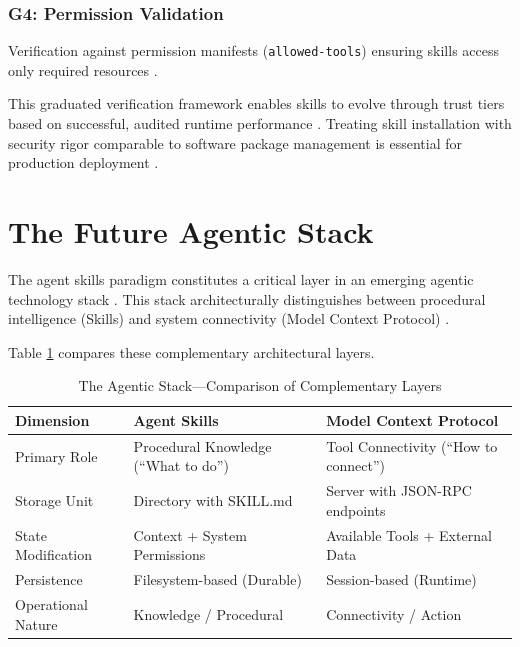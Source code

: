 \documentclass[11pt,a4paper]{article}
\begin{document}
\subsubsection{G4: Permission Validation}

Verification against permission manifests (\texttt{allowed-tools}) ensuring skills access only required resources \cite{alphaxiv2024skills, lmkit2024agentskills}.

This graduated verification framework enables skills to evolve through trust tiers based on successful, audited runtime performance \cite{researchgate2024agentskills}. Treating skill installation with security rigor comparable to software package management is essential for production deployment \cite{researchgate2024agentskills, claude2024agentskills, lobehub2024wereply}.

\section{The Future Agentic Stack}

The agent skills paradigm constitutes a critical layer in an emerging agentic technology stack \cite{alphaxiv2024skills, arxiv2024skillframework}. This stack architecturally distinguishes between procedural intelligence (Skills) and system connectivity (Model Context Protocol) \cite{arxiv2024skillframework}.

Table \ref{tab:stack} compares these complementary architectural layers.

\begin{table}[htp]
\centering
\caption{The Agentic Stack---Comparison of Complementary Layers}
\label{tab:stack}

\begin{tabular}{@{}p{3cm}p{5.5cm}p{5.5cm}@{}}
\toprule
\textbf{Dimension} & \textbf{Agent Skills} & \textbf{Model Context Protocol} \\
\midrule
Primary Role & Procedural Knowledge (``What to do'') & Tool Connectivity (``How to connect'') \cite{alphaxiv2024skills, arxiv2024skillframework} \\
Storage Unit & Directory with SKILL.md & Server with JSON-RPC endpoints \cite{arxiv2024skillframework, lmkit2024agentskills} \\
State Modification & Context + System Permissions & Available Tools + External Data \cite{arxiv2024skillframework} \\
Persistence & Filesystem-based (Durable) & Session-based (Runtime) \cite{arxiv2024skillframework} \\
Operational Nature & Knowledge / Procedural & Connectivity / Action \cite{lmkit2024agentskills} \\
\bottomrule
\end{tabular}
\end{table}
\end{document}
